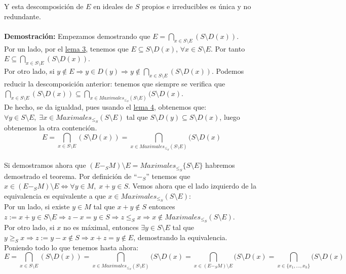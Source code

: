 \documentclass[11pt,spanish]{book}
\begin{document}
Y esta descomposición de $E$ en ideales de $S$ propios e irreducibles es única y no redundante.\\
\\ \textbf{Demostración: }
Empezamos demostrando que $E = \bigcap_{x\in S\setminus E} (S\setminus D(x))$.\\

Por un lado, por el \hyperlink{lema3}{lema 3}, tenemos que $E\subseteq S\setminus D(x)$, $\forall x\in S\setminus E$. Por tanto $E\subseteq \bigcap_{x\in S\setminus E} (S\setminus D(x))$.\\

Por otro lado, si $y\notin E\Rightarrow y\in D(y)\Rightarrow y\notin \bigcap_{x\in S\setminus E} (S\setminus D(x))$. 
Podemos reducir la descomposición anterior: tenemos que siempre se verifica que $\bigcap_{x\in S\setminus E} (S\setminus D(x)) \subseteq \bigcap_{x\in Maximales_{\leq_{S}}(S\setminus E)} (S\setminus D(x)$.\\

De hecho, se da igualdad, pues usando el \hyperlink{lema4}{lema 4}, obtenemos que: 
\\$\forall y\in S\setminus E,\;\exists x\in Maximales_{\leq_{S}}(S\setminus E)$ tal que $S\setminus D(y)\subseteq S\setminus D(x)$, luego obtenemos la otra contención.
$$E = \bigcap_{x\in S\setminus E} (S\setminus D(x)) = \bigcap_{x\in Maximales_{\leq_{S}}(S\setminus E)} (S\setminus D(x)$$ 
\\

Si demostramos ahora que $(E-_{S}M)\setminus E = Maximales_{\leq_{S}}\{S\setminus E\}$ habremos demostrado el teorema. Por definición de ``$-_{S}$'' tenemos que $x\in  (E-_{S}M)\setminus E\Longleftrightarrow \forall y\in M,\; x+y\in S$. Vemos ahora que el lado izquierdo de la equivalencia es equivalente a que $x\in Maximales_{\leq_{S}}(S\setminus E)$:\\

Por un lado, si existe $y\in M$ tal que $x+y\notin S$ entonces $z:=x+y\in S\setminus E\Rightarrow z-x = y\in S\Rightarrow z\leq_{S} x\Rightarrow x\notin Maximales_{\leq_{S}}(S\setminus E)$.\\

Por otro lado, si $x$ no es máximal, entonces $\exists y\in S\setminus E$ tal que $y\geq_{S} x\Rightarrow z:=y-x\notin S\Rightarrow x+z=y\notin E$, demostrando la equivalencia.\\

Poniendo todo lo que tenemos hasta ahora:
$$E = \bigcap_{x\in S\setminus E} (S\setminus D(x)) = \bigcap_{x\in Maximales_{\leq_{S}}(S\setminus E)} (S\setminus D(x) = \bigcap_{x\in (E-_{S} M)\setminus E} (S\setminus D(x) = \bigcap_{x\in \{x_{1},\ldots,x_{h}\}} (S\setminus D(x)$$\\
\end{document}
